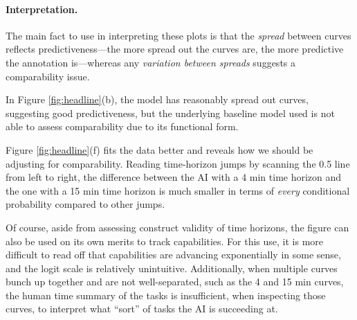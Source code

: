 \documentclass{article}
\theoremstyle{definition}
\newcommand{\task}{\texttt{task}}
\begin{document}
\paragraph{Interpretation.}
The main fact to use in interpreting these plots is that the \emph{spread} between curves reflects predictiveness---the more spread out the curves are, the more predictive the annotation is---whereas any \emph{variation between spreads} suggests a comparability issue. 

In Figure \ref{fig:headline}(b), the model has reasonably spread out curves, suggesting good predictiveness, but the underlying baseline model used is not able to assess comparability due to its functional form. 

Figure \ref{fig:headline}(f) fits the data better and reveals how we should be adjusting for comparability. Reading time-horizon jumps by scanning the 0.5 line from left to right, the difference between the AI with a 4 min time horizon and the one with a 15 min time horizon is much smaller in terms of \emph{every} conditional probability compared to other jumps. 

Of course, aside from assessing construct validity of time horizons, the figure can also be used on its own merits to track capabilities. For this use, it is more difficult to read off that capabilities are advancing exponentially in some sense, and the logit scale is relatively unintuitive. Additionally, when multiple curves bunch up together and are not well-separated, such as the 4 and 15 min curves, the human time summary of the tasks is insufficient, when inspecting those curves, to interpret what ``sort'' of tasks the AI is succeeding at. 




\end{document}
